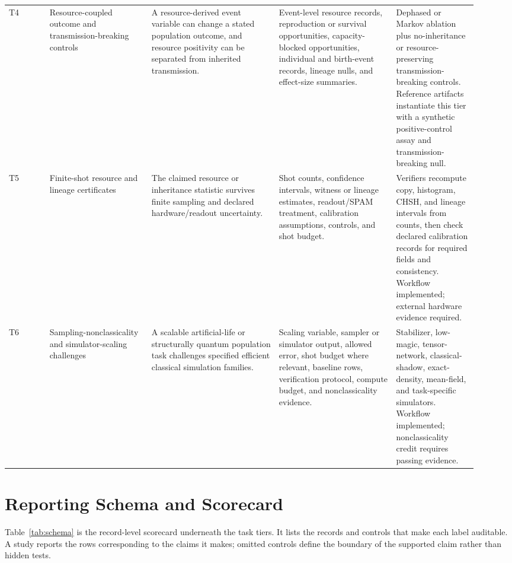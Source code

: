 \documentclass[11pt]{article}
\begin{document}
\begin{center}
\begin{longtable}{P{0.08\linewidth}P{0.20\linewidth}P{0.25\linewidth}P{0.23\linewidth}P{0.16\linewidth}}
\addlinespace
T4 & Resource-coupled outcome and transmission-breaking controls & A resource-derived event variable can change a stated population outcome, and resource positivity can be separated from inherited transmission. & Event-level resource records, reproduction or survival opportunities, capacity-blocked opportunities, individual and birth-event records, lineage nulls, and effect-size summaries. & Dephased or Markov ablation plus no-inheritance or resource-preserving transmission-breaking controls. Reference artifacts instantiate this tier with a synthetic positive-control assay and transmission-breaking null. \\
\addlinespace
T5 & Finite-shot resource and lineage certificates & The claimed resource or inheritance statistic survives finite sampling and declared hardware/readout uncertainty. & Shot counts, confidence intervals, witness or lineage estimates, readout/SPAM treatment, calibration assumptions, controls, and shot budget. & Verifiers recompute copy, histogram, CHSH, and lineage intervals from counts, then check declared calibration records for required fields and consistency. Workflow implemented; external hardware evidence required. \\
\addlinespace
T6 & Sampling-nonclassicality and simulator-scaling challenges & A scalable artificial-life or structurally quantum population task challenges specified efficient classical simulation families. & Scaling variable, sampler or simulator output, allowed error, shot budget where relevant, baseline rows, verification protocol, compute budget, and nonclassicality evidence. & Stabilizer, low-magic, tensor-network, classical-shadow, exact-density, mean-field, and task-specific simulators. Workflow implemented; nonclassicality credit requires passing evidence. \\
\end{longtable}
\end{center}

\section{Reporting Schema and Scorecard}

Table~\ref{tab:schema} is the record-level scorecard underneath the task tiers. It lists the records and controls that make each label auditable. A study reports the rows corresponding to the claims it makes; omitted controls define the boundary of the supported claim rather than hidden tests.
\end{document}
